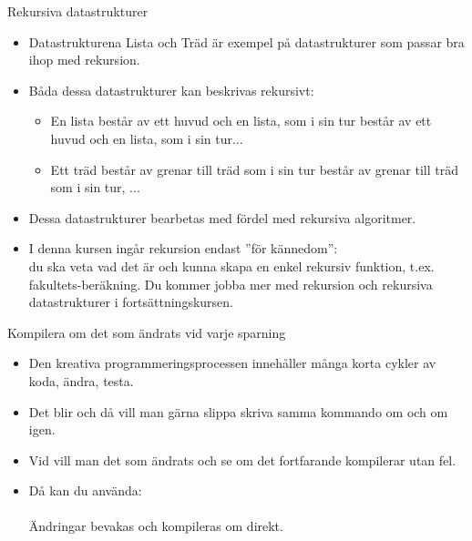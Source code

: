 \begin{Slide}{Rekursiva datastrukturer}
\begin{itemize}
\item Datastrukturena Lista och Träd är exempel på datastrukturer som passar bra ihop med rekursion.
\item Båda dessa datastrukturer kan beskrivas rekursivt:
\begin{itemize}
\item En lista består av ett huvud och en lista, som i sin tur består av ett huvud och en lista, som i sin tur...
\item Ett träd består av grenar till träd som i sin tur består av grenar till träd som i sin tur, ...
\end{itemize}
\item Dessa datastrukturer bearbetas med fördel med rekursiva algoritmer.
\item I denna kursen ingår rekursion endast ''för kännedom'': \\ du ska veta vad det är och kunna skapa en enkel rekursiv funktion, t.ex. fakultets-beräkning. Du kommer jobba mer med rekursion och rekursiva datastrukturer i fortsättningskursen.
\end{itemize}
\end{Slide}


\begin{Slide}{Kompilera om det som ändrats vid varje sparning}
\begin{itemize}
  \item Den kreativa programmeringsprocessen innehåller många korta cykler av koda, ändra, testa.
  \item Det blir  och då vill man gärna slippa skriva samma kommando om och om igen. %
  \item Vid  vill man  det som ändrats och se om det fortfarande kompilerar utan fel. 
  \item Då kan du använda:\\\\Ändringar bevakas och kompileras om direkt.

\end{itemize}
\end{Slide}

